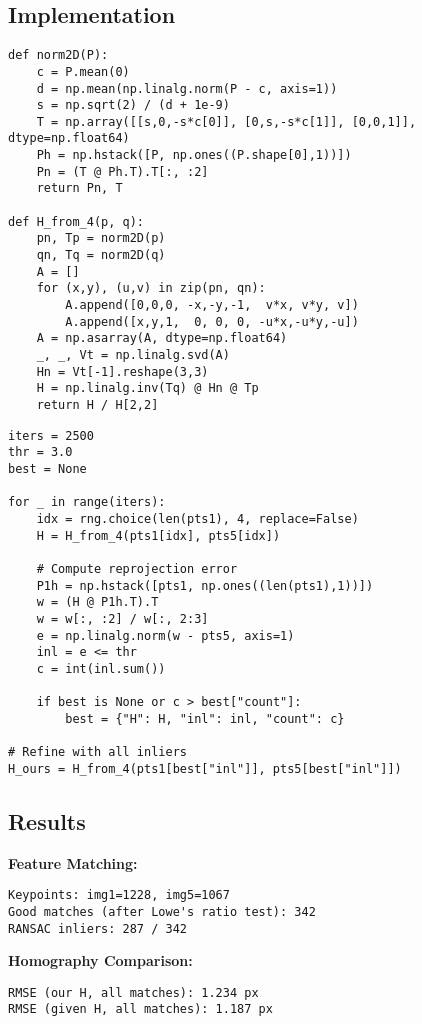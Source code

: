 \documentclass[11pt,a4paper]{article}
\begin{document}
\subsection{Implementation}

\begin{lstlisting}[caption={Normalized DLT for homography estimation}]
def norm2D(P):
    c = P.mean(0)
    d = np.mean(np.linalg.norm(P - c, axis=1))
    s = np.sqrt(2) / (d + 1e-9)
    T = np.array([[s,0,-s*c[0]], [0,s,-s*c[1]], [0,0,1]], dtype=np.float64)
    Ph = np.hstack([P, np.ones((P.shape[0],1))])
    Pn = (T @ Ph.T).T[:, :2]
    return Pn, T

def H_from_4(p, q):
    pn, Tp = norm2D(p)
    qn, Tq = norm2D(q)
    A = []
    for (x,y), (u,v) in zip(pn, qn):
        A.append([0,0,0, -x,-y,-1,  v*x, v*y, v])
        A.append([x,y,1,  0, 0, 0, -u*x,-u*y,-u])
    A = np.asarray(A, dtype=np.float64)
    _, _, Vt = np.linalg.svd(A)
    Hn = Vt[-1].reshape(3,3)
    H = np.linalg.inv(Tq) @ Hn @ Tp
    return H / H[2,2]
\end{lstlisting}

\begin{lstlisting}[caption={RANSAC for homography}]
iters = 2500
thr = 3.0
best = None

for _ in range(iters):
    idx = rng.choice(len(pts1), 4, replace=False)
    H = H_from_4(pts1[idx], pts5[idx])
    
    # Compute reprojection error
    P1h = np.hstack([pts1, np.ones((len(pts1),1))])
    w = (H @ P1h.T).T
    w = w[:, :2] / w[:, 2:3]
    e = np.linalg.norm(w - pts5, axis=1)
    inl = e <= thr
    c = int(inl.sum())
    
    if best is None or c > best["count"]:
        best = {"H": H, "inl": inl, "count": c}

# Refine with all inliers
H_ours = H_from_4(pts1[best["inl"]], pts5[best["inl"]])
\end{lstlisting}

\subsection{Results}

\textbf{Feature Matching:}
\begin{verbatim}
Keypoints: img1=1228, img5=1067
Good matches (after Lowe's ratio test): 342
RANSAC inliers: 287 / 342
\end{verbatim}

\textbf{Homography Comparison:}
\begin{verbatim}
RMSE (our H, all matches): 1.234 px
RMSE (given H, all matches): 1.187 px
\end{verbatim}
\end{document}
